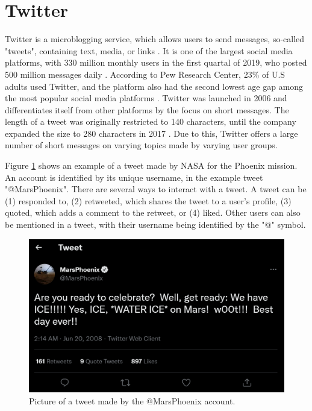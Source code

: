 \section{Twitter}
Twitter is a microblogging service, which allows users to send messages, so-called "tweets", containing text, media, or links \cite{DBLP:journals/csur/GiachanouC16}. It is one of the largest social media platforms, with 330 million monthly users in the first quartal of 2019, who posted 500 million messages daily \cite{twitter:users}. According to Pew Research Center, 23\% of U.S adults used Twitter, and the platform also had the second lowest age gap among the most popular social media platforms \cite{pew:socialmedia}. Twitter was launched in 2006 and differentiates itself from other platforms by the focus on short messages. The length of a tweet was originally restricted to 140 characters, until the company expanded the size to 280 characters in 2017 \cite{twitter:characters}. Due to this, Twitter offers a large number of short messages on varying topics made by varying user groups. 

Figure \ref{fig:example_tweet} shows an example of a tweet made by NASA for the Phoenix mission. An account is identified by its unique username, in the example tweet "@MarsPhoenix". There are several ways to interact with a tweet. A tweet can be (1) responded to, (2) retweeted, which shares the tweet to a user's profile, (3) quoted, which adds a comment to the retweet, or (4) liked. Other users can also be mentioned in a tweet, with their username being identified by the "@" symbol. 

\begin{figure}
    \centering
    \includegraphics[scale=0.3]{Images/twitter_image.png}
    \caption{Picture of a tweet made by the @MarsPhoenix account.}
    \label{fig:example_tweet}
\end{figure}


